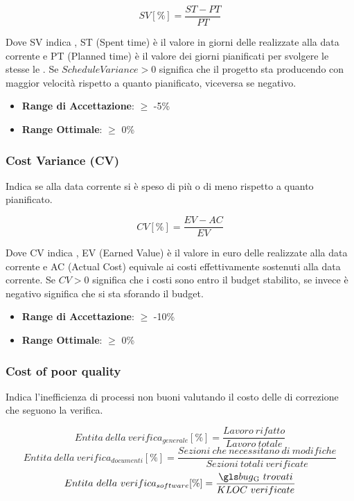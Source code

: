 \documentclass[12pt,a4paper]{article}
\begin{document}
	\[SV [\%] = \frac{ST - PT}{PT}\]
	
	Dove SV indica  , ST (Spent time) è il valore in giorni delle   realizzate alla data corrente e PT (Planned time) è il valore dei giorni pianificati per svolgere le stesse le . Se $ScheduleVariance > 0$ significa che il progetto sta producendo con maggior velocità rispetto a quanto pianificato, viceversa se negativo.
	
	\begin{itemize}
		\item \textbf{Range di Accettazione}: $\geq$ -5\%
		\item \textbf{Range Ottimale}: $\geq$ 0\%
	\end{itemize}
	
	\subsubsection{Cost Variance (CV)}
	Indica se alla data corrente si è speso di più o di meno rispetto a quanto pianificato.
	
	\[CV [\%] = \frac{EV - AC}{EV}\]
	
	Dove CV indica , EV (Earned Value) è il valore in euro delle  realizzate alla data corrente e AC (Actual Cost) equivale ai costi effettivamente sostenuti alla data corrente. Se $CV > 0$ significa che i costi sono entro il budget stabilito, se invece è negativo significa che si sta sforando il budget.
	
	\begin{itemize}
		\item \textbf{Range di Accettazione}: $\geq$ -10\%
		\item \textbf{Range Ottimale}: $\geq$ 0\%
	\end{itemize}
	
	\subsubsection{Cost of poor quality}
	Indica l'inefficienza di processi non buoni valutando il costo delle  di correzione che seguono la verifica.
	
	\[Entita\ della\ verifica_{generale}[\%]= \frac{Lavoro\ rifatto}{Lavoro\ totale}\]
	\[Entita\ della\ verifica_{documenti}[\%]= \frac{Sezioni\ che\ necessitano\ di\ modifiche}{Sezioni\ totali\ verificate}\]
	\[Entita\ della\ verifica_{software}[\%]= \frac{\mgls{bug}\ trovati}{KLOC\ verificate}\]
	
\end{document}
